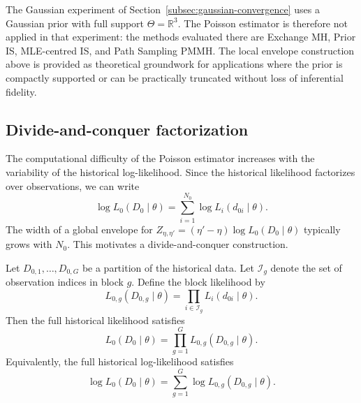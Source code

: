 \begin{remark*}
The Gaussian experiment of Section~\ref{subsec:gaussian-convergence} uses a Gaussian prior with full support $\Theta = \mathds{R}^3$.
The Poisson estimator is therefore not applied in that experiment: the methods evaluated there are Exchange MH, Prior IS, MLE-centred IS, and Path Sampling PMMH.
The local envelope construction above is provided as theoretical groundwork for applications where the prior is compactly supported or can be practically truncated without loss of inferential fidelity.    
\end{remark*}

\subsection{Divide-and-conquer factorization}
\label{subsec:divide-and-conquer}


The computational difficulty of the Poisson estimator increases with the variability of the historical log-likelihood.
Since the historical likelihood factorizes over observations, we can write
\begin{equation}
    \log L_0(D_0\mid\theta)
    =
    \sum_{i=1}^{N_0}\log L_i(d_{0i}\mid\theta).
\end{equation}
The width of a global envelope for $Z_{\eta,\eta'}=(\eta'-\eta)\log L_0(D_0\mid\theta)$ typically grows with $N_0$.
This motivates a divide-and-conquer construction.

Let $D_{0,1},\ldots,D_{0,G}$ be a partition of the historical data.
Let $\mathcal I_g$ denote the set of observation indices in block $g$.
Define the block likelihood by
\begin{equation}
    L_{0,g}(D_{0,g}\mid\theta)
    =
    \prod_{i\in\mathcal I_g} L_i(d_{0i}\mid\theta).
\end{equation}
Then the full historical likelihood satisfies
\begin{equation}
    L_0(D_0\mid\theta)
    =
    \prod_{g=1}^{G} L_{0,g}(D_{0,g}\mid\theta).
\end{equation}
Equivalently, the full historical log-likelihood satisfies
\begin{equation}
    \log L_0(D_0\mid\theta)
    =
    \sum_{g=1}^{G}\log L_{0,g}(D_{0,g}\mid\theta).
\end{equation}

